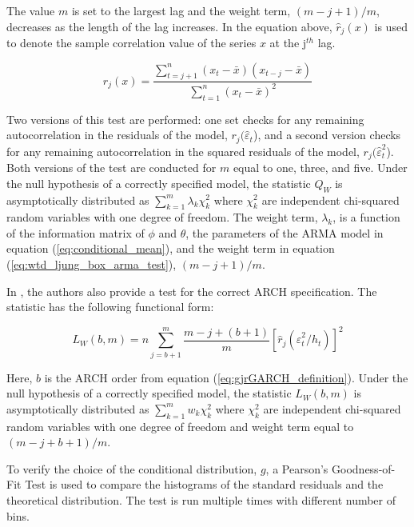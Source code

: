 \documentclass[12pt]{article}
\begin{document}
The value $m$ is set to the largest lag and the weight term, $(m - j + 1) / m$, decreases as the length of the lag increases. In the equation above, $\hat{r}_{j}(x)$ is used to denote the sample correlation value of the series $x$ at the j$^{th}$ lag.

\begin{equation} \label{eq:sample_correlation}
	r_{j}(x) = \frac{\sum_{t=j+1}^{n} (x_{t} - \bar{x}) (x_{t-j} - \bar{x})}{\sum_{t=1}^{n} (x_{t} - \bar{x})^{2}}
\end{equation}

Two versions of this test are performed: one set checks for any remaining autocorrelation in the residuals of the model, $r_{j}(\hat{\varepsilon}_{t}$), and a second version checks for any remaining autocorrelation in the squared residuals of the model, $r_{j}(\hat{\varepsilon}_{t}^{2}$). Both versions of the test are conducted for $m$ equal to one, three, and five. Under the null hypothesis of a correctly specified model, the statistic $Q_{W}$ is asymptotically distributed as $\sum_{k=1}^{m} \lambda_{k} \chi_{k}^{2}$ where $\chi_{k}^{2}$ are independent chi-squared random variables with one degree of freedom. The weight term, $\lambda_{k}$, is a function of the information matrix of $\phi$ and $\theta$, the parameters of the ARMA model in equation (\ref{eq:conditional_mean}), and the weight term in equation (\ref{eq:wtd_ljung_box_arma_test}), $(m - j + 1) / m$.

In \cite{Fisher_Gallagher_2012}, the authors also provide a test for the correct ARCH specification. The statistic has the following functional form:

\begin{equation}
	L_{W}(b,m) = n \sum_{j=b+1}^{m} \frac{m - j + (b + 1)}{m} [\hat{r}_{j} \left( \hat{\varepsilon}_{t}^{2} / h_{t} \right)]^{2} 
\end{equation}

Here, $b$ is the ARCH order from equation (\ref{eq:gjrGARCH_definition}). Under the null hypothesis of a correctly specified model, the statistic $L_{W}(b,m)$ is asymptotically distributed as $\sum_{k=1}^{m} w_{k} \chi_{k}^{2}$ where $\chi_{k}^{2}$ are independent chi-squared random variables with one degree of freedom and weight term equal to $(m - j + b + 1) / m$.

To verify the choice of the conditional distribution, $g$, a Pearson's Goodness-of-Fit Test is used to compare the histograms of the standard residuals and the theoretical distribution. The test is run multiple times with different number of bins.
\end{document}
